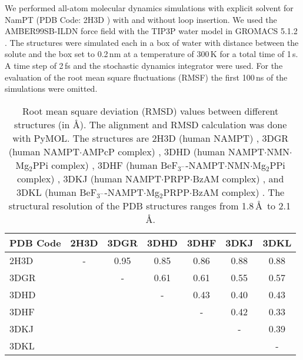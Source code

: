 \documentclass[a4paper,10pt]{article}
\begin{document}
We performed all-atom molecular dynamics simulations with explicit solvent for NamPT (PDB Code: 2H3D \cite{Wang2006}) with and without loop insertion. We used the AMBER99SB-ILDN force field \cite{Lindorff-Larsen2010} with the TIP3P water model \cite{Jorgensen1983} in GROMACS 5.1.2 \cite{Abraham2015}. The structures were simulated each in a box of water with distance between the solute and the box set to 0.2\,nm at a temperature of 300\,K for a total time of 1\,\textmu s. A time step of 2\,fs and the stochastic dynamics integrator were used. For the evaluation of the root mean square fluctuations (RMSF) the first 100\,ns of the simulations were omitted.
 
\begin{table}
 \caption{Root mean square deviation (RMSD) values between different structures (in \AA). The alignment and RMSD calculation was done with PyMOL\cite{PyMOL}. The structures are 2H3D (human NAMPT) \cite{Wang2006}, 3DGR (human NAMPT$\cdot$AMPcP complex) \cite{Burgos2009}, 3DHD (human NAMPT$\cdot$NMN$\cdot$Mg$_2$PPi complex) \cite{Burgos2009}, 3DHF (human BeF$_{3^-}$-NAMPT$\cdot$NMN$\cdot$Mg$_2$PPi complex) \cite{Burgos2009}, 3DKJ (human NAMPT$\cdot$PRPP$\cdot$BzAM complex) \cite{Burgos2009}, and 3DKL (human BeF$_{3^-}$-NAMPT$\cdot$Mg$_2$PRPP$\cdot$BzAM complex) \cite{Burgos2009}. The structural resolution of the PDB structures ranges from 1.8\,\AA~to 2.1\,\AA.}
 \begin{tabular}{l|cccccc}
  \toprule
  PDB Code & 2H3D & 3DGR & 3DHD & 3DHF & 3DKJ & 3DKL \\ 
  \midrule
  2H3D & - & 0.95 & 0.85 & 0.86 & 0.88 & 0.88 \\
  3DGR &   &  -   & 0.61 & 0.61 & 0.55 & 0.57 \\
  3DHD &   &      &  -   & 0.43 & 0.40 & 0.43 \\
  3DHF &   &      &      &  -   & 0.42 & 0.33 \\
  3DKJ &   &      &      &      &  -   & 0.39 \\
  3DKL &   &      &      &      &      &  -   \\
 \bottomrule
 \end{tabular}
\end{table}
\end{document}

